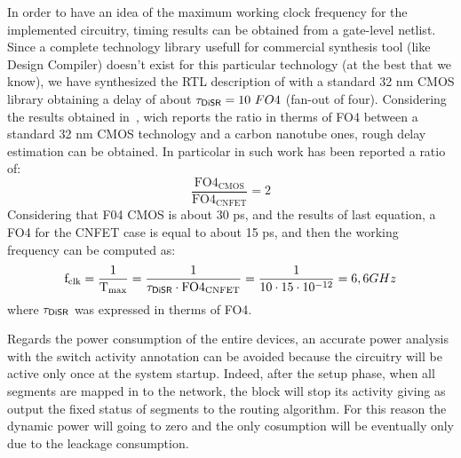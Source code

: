 In order to have an idea of the maximum working clock frequency for
the implemented circuitry, timing results can be obtained from a 
gate-level netlist. Since a complete technology library usefull for
commercial synthesis tool (like Design Compiler) doesn't exist for 
this particular technology (at the best that we know), we have
synthesized the RTL description of \disr{} with a standard 32 nm CMOS
library obtaining  a delay of about $\mathrm{\tau_{\disr{}}=10} \ FO4$
(fan-out of four). Considering the results obtained
in~\cite{deng_isscc07}, wich reports the ratio in therms of FO4
between a standard 32 nm CMOS technology and a carbon nanotube ones, 
rough delay estimation can be obtained. In particolar in such work 
has been reported a ratio of:  
\begin{equation}
\mathrm{\frac{FO4_{CMOS}}{FO4_{CNFET}}=2}  
\end{equation}
Considering that F04 CMOS is about 30 ps, and the results of last
equation, a FO4 for the CNFET case is equal to about 15 ps, and
then the working frequency can be computed as:
\begin{equation}
\mathrm{f_{clk}=\frac{1}{T_{max}}=\frac{1}{\tau_{{\sf DiSR}{}} \cdot FO4_{CNFET}}}=
\frac{1}{10\cdot 15 \cdot 10^{-12}}=6,6 GHz
\end{equation}
where $\mathrm{\tau_{{\sf DiSR}{}}}$ was expressed in therms of FO4.

Regards the power consumption of the entire \disr{} devices, 
an accurate power analysis with the switch activity
annotation can be avoided because the \disr{} circuitry will be active 
only once at the system startup. Indeed, after the setup phase, when all segments
are mapped in to the network, the \disr{} block will stop its activity
giving as output the fixed status of segments to the routing
algorithm. For this reason the dynamic power will going  to zero and
the only cosumption will be eventually only due to the leackage
consumption.
